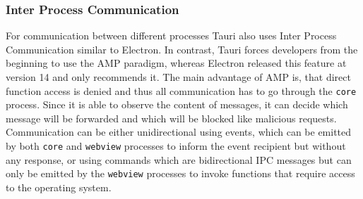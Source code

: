\subsubsection{Inter Process Communication}
For communication between different processes Tauri also uses Inter Process Communication similar to Electron.
In contrast, Tauri forces developers from the beginning to use the \ac{AMP} paradigm, whereas Electron released this feature at version 14 and only recommends it.
The main advantage of \ac{AMP} is, that direct function access is denied and thus all communication has to go through the \texttt{core} process.
Since it is able to observe the content of messages, it can decide which message will be forwarded and which will be blocked like malicious requests.
Communication can be either unidirectional using events, which can be emitted by both \texttt{core} and \texttt{webview} processes to inform the event recipient but without any response,
or using commands which are bidirectional \ac{IPC} messages but can only be emitted by the \texttt{webview} processes to invoke functions that require access to the operating system.

